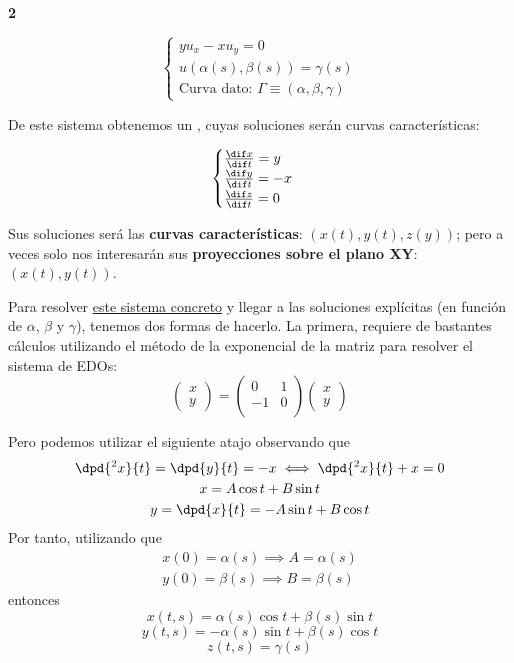 	\begin{example}{\bf 2}

		\begin{equation*}
			\begin{cases}
				yu_x - x u_y = 0 \\
				u(\alpha(s),\beta(s)) = \gamma(s) \\
				\text{Curva dato: } \Gamma \equiv (\alpha, \beta, \gamma)
			\end{cases}
		\end{equation*}

		De este sistema obtenemos un , cuyas soluciones serán curvas características:

		\begin{equation*}
			\begin{cases}
				\frac{\dif x}{\dif t} = y \\
				\frac{\dif y}{\dif t} = -x \\
				\frac{\dif z}{\dif t} = 0
			\end{cases}
		\end{equation*}

		Sus soluciones será las {\bf curvas características}:
		$(x(t),y(t),z(y))$; pero a veces solo nos interesarán sus {\bf proyecciones sobre el plano XY}: $(x(t),y(t))$.

		Para resolver \underline{este sistema concreto} y llegar a las soluciones explícitas (en función de $\alpha$, $\beta$ y $\gamma$), tenemos dos formas de hacerlo.
		La primera, requiere de bastantes cálculos utilizando el método de la exponencial de la matriz para resolver el sistema de EDOs:
		\[ \begin{pmatrix}
			x \\
			y
			\end{pmatrix} =
		\begin{pmatrix}
			 0 & 1 \\
			-1 & 0 \\
			\end{pmatrix}
			\begin{pmatrix}
			x \\
			y
			\end{pmatrix}\]

		Pero podemos utilizar el siguiente atajo observando que
		\begin{gather*}
			\dpd{^2 x}{t} = \dpd{y}{t} = -x \iff \dpd{^2 x}{t} + x = 0\\
			x = A \cos t + B \sin t\\
			y = \dpd{x}{t} = -A \sin t + B \cos t
		\end{gather*}
		Por tanto, utilizando que
		\begin{gather*}
			x(0) =\alpha(s)	\implies A = \alpha(s)\\
			y(0) = \beta(s) \implies B = \beta(s)
		\end{gather*}
		entonces
		$$x(t,s) = \alpha(s) \cos t + \beta (s) \sin t$$
		$$y(t,s) = -\alpha(s) \sin t + \beta (s) \cos t$$
		$$z(t,s) = \gamma(s)$$


\end{example}
